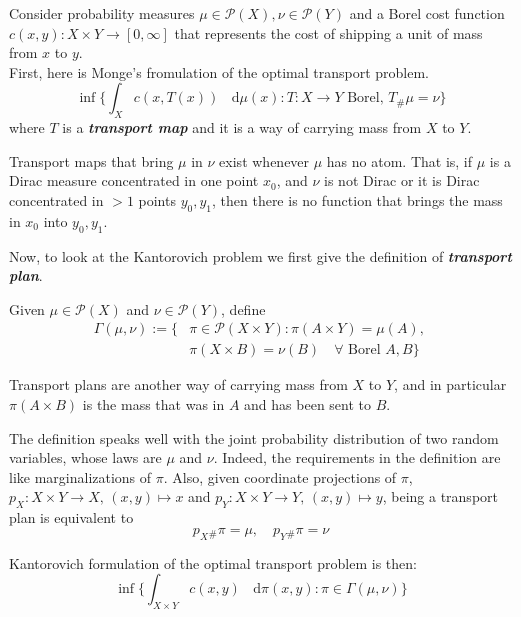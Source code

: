 \documentclass[a4paper,12pt,reqno]{amsbook}
\theoremstyle{definition} %
\newcommand*\de{\mathop{}\!\mathrm{d}}
\newcommand{\1}{\mathbbm{1}}
\newcommand{\mP}{\mathscr{P}}
\theoremstyle{plain}
\theoremstyle{remark}
\begin{document}
Consider probability measures $\mu \in \mP(X), \nu \in \mP(Y)$ and a Borel cost function $c(x,y):X\times Y \to [0, \infty]$ that represents the cost of shipping a unit of mass from $x$ to $y$.
\\

First, here is Monge's fromulation of the optimal transport problem. 
\begin{equation}\tag{M}\label{def: otM}
        \inf\bigg\{\int_{X} c(x,T(x)) \,\,\de{\mu}(x) : T:X\to Y \text{ Borel, } T_\#\mu=\nu\bigg\}
\end{equation}
where $T$ is a\textit{\textbf{ transport map}} and it is a way of carrying mass from $X$ to $Y$.

\begin{remark}
    Transport maps that bring $\mu$ in $\nu$ exist whenever $\mu$ has no atom. That is, if $\mu$ is a Dirac measure concentrated in one point $x_0$, and $\nu$ is not Dirac or it is Dirac concentrated in $>1$ points $y_0,y_1$, then there is no function that brings the mass in $x_0$ into $y_0, y_1$.
\end{remark}

Now, to look at the Kantorovich problem we first give the definition of \textit{\textbf{transport plan}}.

\begin{definition}
    Given $\mu \in \mP(X)$ and $\nu \in \mP(Y)$, define
    \begin{align*} 
        \Gamma (\mu, \nu) := \{ &\pi \in \mP(X \times Y) : \pi(A\times Y) = \mu(A),\,\\ &\pi(X\times B) = \nu(B) \quad \forall \text{ Borel } A,B\}
    \end{align*}
    

\end{definition}

Transport plans are another way of carrying mass from $X$ to $Y$, and in particular $\pi(A\times B)$ is the mass that was in $A$ and has been sent to $B$.

The definition speaks well with the joint probability distribution of two random variables, whose laws are $\mu$ and $\nu$. Indeed, the requirements in the definition are like marginalizations of $\pi$. Also, given coordinate projections of $\pi$, $p_X: X\times Y \to X, \, (x,y) \mapsto x$ and $p_Y: X \times Y \to Y, \, (x,y) \mapsto y$, being a transport plan is equivalent to 
\[
p_X{_\# }\pi = \mu, \quad p_Y{_\# }\pi = \nu
\]

Kantorovich formulation of the optimal transport problem is then:
\begin{equation}\tag{K}\label{def: otK}
    \inf\bigg\{\int_{X\times Y} c(x,y) \,\,\de{\pi}(x,y) : \pi \in \Gamma(\mu,\nu) \bigg\}
\end{equation}
\end{document}
